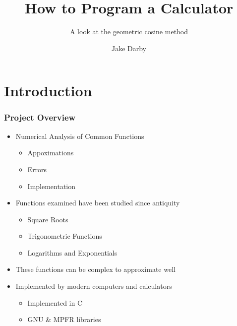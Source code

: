 \documentclass[12pt]{beamer}
\title{How to Program a Calculator}
\date{}
\subtitle{A look at the geometric cosine method}
\author{Jake Darby}
\begin{document}
\section{Introduction}

\begin{frame}
\titlepage
\end{frame}



\begin{frame}
\frametitle{Project Overview}
\begin{itemize}[<+(1)->]
	\item Numerical Analysis of Common Functions
	\begin{itemize}[<+(1)->]
		\item Appoximations
		\item Errors
		\item Implementation
	\end{itemize}
	\item Functions examined have been studied since antiquity
	\begin{itemize}[<+(1)->]
		\item Square Roots
		\item Trigonometric Functions
		\item Logarithms and Exponentials
	\end{itemize}
	\item These functions can be complex to approximate well
	\item Implemented by modern computers and calculators
	\begin{itemize}[<+(1)->]
		\item Implemented in C
		\item GNU \& MPFR libraries
	\end{itemize}
\end{itemize}
\end{frame}
\end{document}
